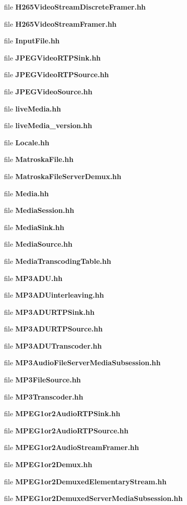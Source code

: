 \begin{DoxyCompactItemize}
file {\bf H265\+Video\+Stream\+Discrete\+Framer.\+hh}
\item 
file {\bf H265\+Video\+Stream\+Framer.\+hh}
\item 
file {\bf Input\+File.\+hh}
\item 
file {\bf J\+P\+E\+G\+Video\+R\+T\+P\+Sink.\+hh}
\item 
file {\bf J\+P\+E\+G\+Video\+R\+T\+P\+Source.\+hh}
\item 
file {\bf J\+P\+E\+G\+Video\+Source.\+hh}
\item 
file {\bf live\+Media.\+hh}
\item 
file {\bf live\+Media\+\_\+version.\+hh}
\item 
file {\bf Locale.\+hh}
\item 
file {\bf Matroska\+File.\+hh}
\item 
file {\bf Matroska\+File\+Server\+Demux.\+hh}
\item 
file {\bf Media.\+hh}
\item 
file {\bf Media\+Session.\+hh}
\item 
file {\bf Media\+Sink.\+hh}
\item 
file {\bf Media\+Source.\+hh}
\item 
file {\bf Media\+Transcoding\+Table.\+hh}
\item 
file {\bf M\+P3\+A\+D\+U.\+hh}
\item 
file {\bf M\+P3\+A\+D\+Uinterleaving.\+hh}
\item 
file {\bf M\+P3\+A\+D\+U\+R\+T\+P\+Sink.\+hh}
\item 
file {\bf M\+P3\+A\+D\+U\+R\+T\+P\+Source.\+hh}
\item 
file {\bf M\+P3\+A\+D\+U\+Transcoder.\+hh}
\item 
file {\bf M\+P3\+Audio\+File\+Server\+Media\+Subsession.\+hh}
\item 
file {\bf M\+P3\+File\+Source.\+hh}
\item 
file {\bf M\+P3\+Transcoder.\+hh}
\item 
file {\bf M\+P\+E\+G1or2\+Audio\+R\+T\+P\+Sink.\+hh}
\item 
file {\bf M\+P\+E\+G1or2\+Audio\+R\+T\+P\+Source.\+hh}
\item 
file {\bf M\+P\+E\+G1or2\+Audio\+Stream\+Framer.\+hh}
\item 
file {\bf M\+P\+E\+G1or2\+Demux.\+hh}
\item 
file {\bf M\+P\+E\+G1or2\+Demuxed\+Elementary\+Stream.\+hh}
\item 
file {\bf M\+P\+E\+G1or2\+Demuxed\+Server\+Media\+Subsession.\+hh}

\end{DoxyCompactItemize}
